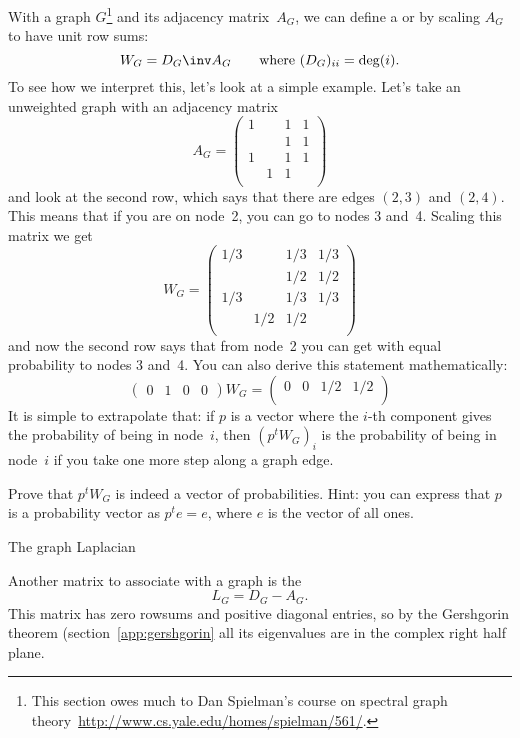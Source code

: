 With a graph $G$\footnote{This section owes much to Dan Spielman's course
on spectral graph theory~\url{http://www.cs.yale.edu/homes/spielman/561/}.}
and its adjacency matrix~$A_G$, we can define a
 or  by scaling
$A_G$ to have unit row sums:
\[ W_G = D_G\inv A_G\qquad \hbox{where $(D_G)_{ii}=\deg(i)$}. \]
To see how we interpret this, let's look at a simple example.
Let's take an unweighted graph with an adjacency matrix
\[
A_G = \begin{pmatrix}
1& &1&1\\
 & &1&1\\
1& &1&1\\
 &1&1& \\
\end{pmatrix}
\]
and look at the second row, which says that there are edges $(2,3)$ 
and $(2,4)$. This means that if you are on node~2, you can go 
to nodes 3 and~4. Scaling this matrix we get
\[
W_G = \begin{pmatrix}
1/3&   &1/3&1/3\\
   &   &1/2&1/2\\
1/3&   &1/3&1/3\\
   &1/2&1/2&   \\
\end{pmatrix}
\]
and now the second row says that from node~2 you can get
with equal probability to nodes 3 and~4.
You can also derive this statement mathematically:
\[
\begin{pmatrix}
0&1&0&0
\end{pmatrix} W_G =
\begin{pmatrix}
  0&  0&1/2&1/2\\
\end{pmatrix}
\]
It is simple to extrapolate that: if $p$ is a vector where the $i$-th
component gives the probability of being in node~$i$, then $(p^tW_G)_i$
is the probability of being in node~$i$ if you take one more
step along a graph edge.

\begin{exercise}
Prove that $p^tW_G$ is indeed a vector of probabilities. Hint: 
you can express that $p$ is a probability vector as $p^te=e$,
where $e$ is the vector of all ones.
\end{exercise}

 {The graph Laplacian}
\label{sec:graph-laplace}

Another matrix to associate with a graph is the
\[ L_G = D_G-A_G. \]
This matrix has zero rowsums and positive diagonal entries, so by the
Gershgorin theorem (section~\ref{app:gershgorin} all its eigenvalues
are in the complex right half plane. 

